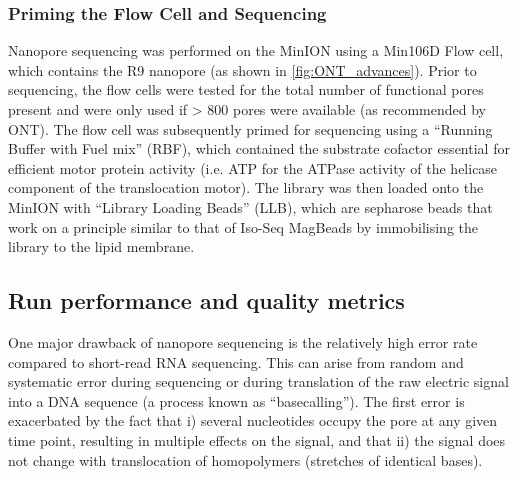 \subsubsection{Priming the Flow Cell and Sequencing}
\label{sec: ONTlib_sequencing}
Nanopore sequencing was performed on the MinION using a Min106D Flow cell, which contains the R9 nanopore (as shown in \cref{fig:ONT_advances}). Prior to sequencing, the flow cells were tested for the total number of functional pores present and were only used if > 800 pores were available (as recommended by ONT). The flow cell was subsequently primed for sequencing using a “Running Buffer with Fuel mix” (RBF), which contained the substrate cofactor essential for efficient motor protein activity (i.e. ATP for the ATPase activity of the helicase component of the translocation motor). The library was then loaded onto the MinION with “Library Loading Beads” (LLB), which are sepharose beads that work on a principle similar to that of Iso-Seq MagBeads by immobilising the library to the lipid membrane.

\subsection{Run performance and quality metrics}
\label{ONT_performance}
One major drawback of nanopore sequencing is the relatively high error rate compared to short-read RNA sequencing. This can arise from random and systematic error during sequencing or during translation of the raw electric signal into a DNA sequence (a process known as “basecalling”)\cite{Rang2018}. The first error is exacerbated by the fact that i) several nucleotides occupy the pore at any given time point, resulting in multiple effects on the signal, and that ii) the signal does not change with translocation of homopolymers (stretches of identical bases).

